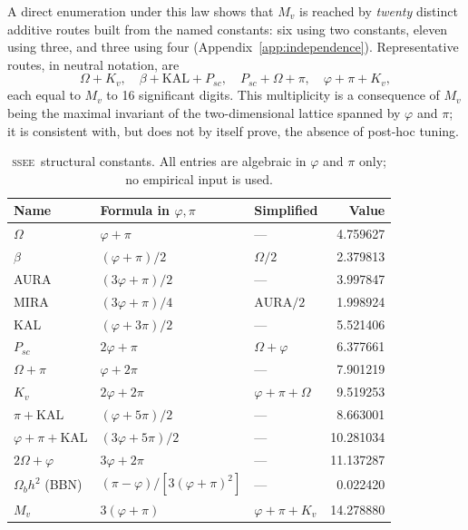 \documentclass[12pt,a4paper]{article}
\newcommand{\SSEE}{\ifmmode\mathrm{SSEE}\else\textsc{ssee}\fi}
\begin{document}
A direct enumeration under this law shows that $M_v$ is reached by
\emph{twenty} distinct additive routes built from the named constants: six using
two constants, eleven using three, and three using four (Appendix~\ref{app:independence}).
Representative routes, in neutral notation, are
\begin{equation}
\Omega+K_v,\quad \beta+\mathrm{KAL}+P_{sc},\quad P_{sc}+\Omega+\pi,\quad \varphi+\pi+K_v ,
\end{equation}
each equal to $M_v$ to 16 significant digits. This multiplicity is a
consequence of $M_v$ being the maximal invariant of the two-dimensional
lattice spanned by $\varphi$ and $\pi$; it is consistent with, but does not by itself
prove, the absence of post-hoc tuning.

\begin{table}[ht]
\centering
\caption{\SSEE\ structural constants. All entries are algebraic in $\varphi$
and $\pi$ only; no empirical input is used.}
\label{tab:constants}
\begin{tabular}{lll r}
\toprule
Name & Formula in $\varphi,\pi$ & Simplified & Value \\
\midrule
$\Omega$ & $\varphi+\pi$                           & —              & 4.759627 \\
$\beta$ & $(\varphi+\pi)/2$                       & $\Omega/2$     & 2.379813 \\
AURA  & $(3\varphi+\pi)/2$                      & —              & 3.997847 \\
MIRA  & $(3\varphi+\pi)/4$                      & $\mathrm{AURA}/2$ & 1.998924 \\
KAL   & $(\varphi+3\pi)/2$                      & —              & 5.521406 \\
$P_{sc}$ & $2\varphi+\pi$                       & $\Omega+\varphi$ & 6.377661 \\
$\Omega+\pi$ & $\varphi+2\pi$                   & —              & 7.901219 \\
$K_v$ & $2\varphi+2\pi$                          & $\varphi+\pi+\Omega$ & 9.519253 \\
$\pi+\mathrm{KAL}$ & $(\varphi+5\pi)/2$         & —              & 8.663001 \\
$\varphi+\pi+\mathrm{KAL}$ & $(3\varphi+5\pi)/2$ & —             & 10.281034 \\
$2\Omega+\varphi$ & $3\varphi+2\pi$              & —              & 11.137287 \\
$\Omega_b h^2$ (BBN) & $(\pi-\varphi)/[3(\varphi+\pi)^2]$      & —              & 0.022420 \\
$M_v$ & $3(\varphi+\pi)$           & $\varphi+\pi+K_v$ & 14.278880 \\
\bottomrule
\end{tabular}
\end{table}
\end{document}
